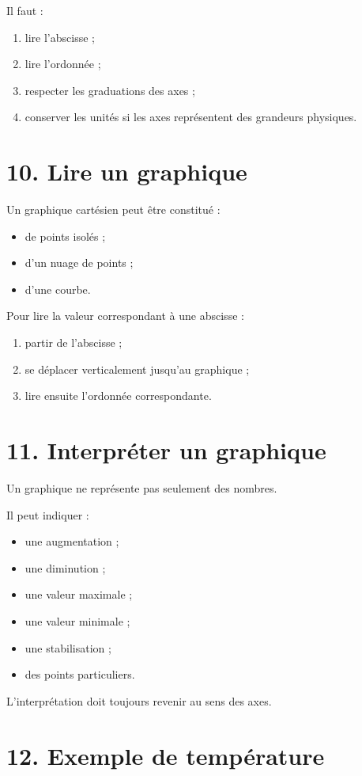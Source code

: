 Il faut :
\begin{enumerate}
\item lire l'abscisse ;
\item lire l'ordonnée ;
\item respecter les graduations des axes ;
\item conserver les unités si les axes représentent des grandeurs physiques.
\end{enumerate}

\section{10. Lire un graphique}

Un graphique cartésien peut être constitué :
\begin{itemize}
\item de points isolés ;
\item d'un nuage de points ;
\item d'une courbe.
\end{itemize}

Pour lire la valeur correspondant à une abscisse :
\begin{enumerate}
\item partir de l'abscisse ;
\item se déplacer verticalement jusqu'au graphique ;
\item lire ensuite l'ordonnée correspondante.
\end{enumerate}

\section{11. Interpréter un graphique}

Un graphique ne représente pas seulement des nombres.

Il peut indiquer :
\begin{itemize}
\item une augmentation ;
\item une diminution ;
\item une valeur maximale ;
\item une valeur minimale ;
\item une stabilisation ;
\item des points particuliers.
\end{itemize}

L'interprétation doit toujours revenir au sens des axes.

\section{12. Exemple de température}

